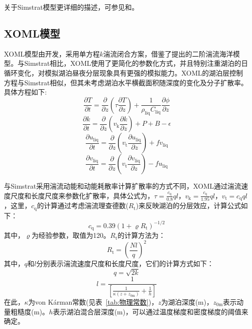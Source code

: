 关于Simstrat模型更详细的描述，可参见\citet{goudsmit2002application}和\citet{gaudardOptimizingParameterizationDeep2017}。

\subsection{XOML模型}\label{XOML模型}
\label{XOML Model}

XOML模型由\citet{ling2015multilevel}开发，采用单方程$k$湍流闭合方案，借鉴了\citet{noh2002simulation,noh2011prediction}提出的二阶湍流海洋模型。与Simstrat相比，XOML使用了更简化的参数化方式，并且特别注重湖泊的日循环变化，对模拟湖泊昼夜分层现象具有更强的模拟能力。XOML的湖泊层控制方程与Simstrat相似，但其未考虑湖泊水平横截面积随深度的变化及分子扩散率。具体方程如下:
\begin{equation}
    \frac{\partial T}{\partial t} = \frac{\partial}{\partial z} \left( \tau \frac{\partial T}{\partial z} \right) + \frac{1}{\rho_{\mathrm{liq}} C_{\mathrm{liq}}} \frac{\partial \phi}{\partial z}
\end{equation}
\begin{equation}
    \frac{\partial k}{\partial t} = \frac{\partial}{\partial z} \left( v_{\mathrm{k}} \frac{\partial k}{\partial z} \right) + P + B - \epsilon
\end{equation}
\begin{equation}
    \frac{\partial u_{\mathrm{liq}}}{\partial t} = \frac{\partial}{\partial z} \left( v_{\mathrm{t}} \frac{\partial u_{\mathrm{liq}}}{\partial z} \right) + f v_{\mathrm{liq}}
\end{equation}
\begin{equation}
    \frac{\partial v_{\mathrm{liq}}}{\partial t} = \frac{\partial}{\partial z} \left( v_{\mathrm{t}} \frac{\partial v_{\mathrm{liq}}}{\partial z} \right) - f u_{\mathrm{liq}}
\end{equation}

与Simstrat采用湍流动能和动能耗散率计算扩散率的方式不同，XOML通过湍流速度尺度和长度尺度来参数化扩散率，具体公式为，$\tau = \frac{c_{\mathrm{q}}}{0.8} q l$，$v_{\mathrm{k}} = \frac{c_{\mathrm{q}}}{1.95} q l$，$v_{\mathrm{t}} = c_{\mathrm{q}} q l$，这里，$c_{\mathrm{q}}$的计算通过考虑湍流理查德数($R_{\mathrm{t}}$)来反映湖泊的分层效应，计算公式如下：
\begin{equation}
    c_{\mathrm{q}} = 0.39(1 + \varrho R_{\mathrm{t}})^{-1/2}
\end{equation}
其中，$\varrho$为经验参数，取值为120。$R_{\mathrm{t}}$的计算方法为：
\begin{equation}
    R_{\mathrm{t}} = \left( \frac{N l}{q} \right)^2
\end{equation}
其中，$q$和$l$分别表示湍流速度尺度和长度尺度，它们的计算方式如下：
\begin{equation}
    q = \sqrt{2k}
\end{equation}
\begin{equation}
    l = \frac{1}{\left[ \frac{1}{\kappa(z + z_{\mathrm{0m}})} + \frac{1}{h} \right]}
\end{equation}
在此，$\kappa$为von K\'arman常数(见表~\ref{tab:物理常数})，$z$为湖泊深度(\unit{m})，$z_{\mathrm{0m}}$表示动量粗糙度(\unit{m})。$h$表示湖泊混合层深度(\unit{m})，可以通过温度梯度和密度梯度的阈值来确定。

